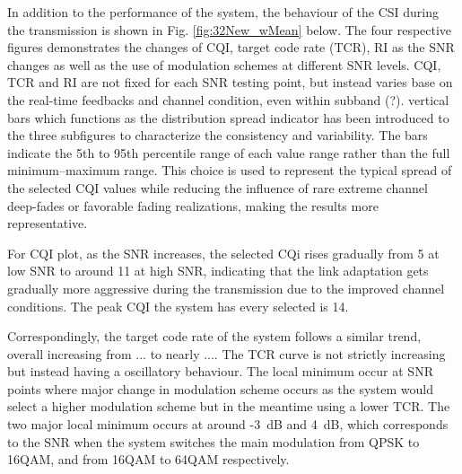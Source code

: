 \documentclass[a4paper,12pt,onecolumn]{article}
\begin{document}
	\begin{highlightblock}
	
		In addition to the performance of the system, the behaviour of the CSI during the transmission is shown in Fig. \ref{fig:32New_wMean} below. The four respective figures demonstrates the changes of CQI, target code rate (TCR), RI as the SNR changes as well as the use of modulation schemes at different SNR levels. CQI, TCR and RI are not fixed for each SNR testing point, but instead varies base on the real-time feedbacks and channel condition, even within subband (?). vertical bars which functions as the distribution spread indicator has been introduced to the three subfigures to characterize the consistency and variability. The bars indicate the 5th to 95th percentile range of each value range rather than the full minimum--maximum range. This choice is used to represent the typical spread of the selected CQI values while reducing the influence of rare extreme channel deep-fades or favorable fading realizations, making the results more representative.
		
		For CQI plot, as the SNR increases, the selected CQi rises gradually from 5 at low SNR to around 11 at high SNR, indicating that the link adaptation gets gradually more aggressive during the transmission due to the improved channel conditions. The peak CQI the system has every selected is 14. 
		
		Correspondingly, the target code rate of the system follows a similar trend, overall increasing from ... to nearly .... The TCR curve is not strictly increasing but instead having a oscillatory behaviour. The local minimum occur at SNR points where major change in modulation scheme occurs as the system would select a higher modulation scheme but in the meantime using a lower TCR. The two major local minimum occurs at around -3~dB and 4~dB, which corresponds to the SNR when the system switches the main modulation from QPSK to 16QAM, and from 16QAM to 64QAM respectively.
			\end{highlightblock}
			
\end{document}
